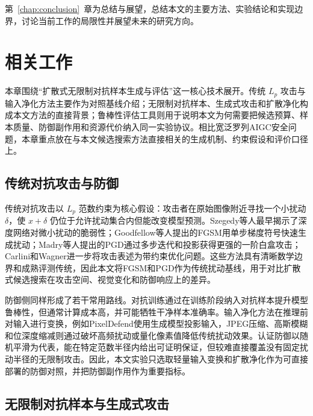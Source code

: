 \documentclass[type=bachelor,oneside]{fduthesis}
\begin{document}
第~\ref{chap:conclusion}~章为总结与展望，总结本文的主要方法、实验结论和实现边界，讨论当前工作的局限性并展望未来的研究方向。

\chapter{相关工作}
\label{chap:related}

本章围绕“扩散式无限制对抗样本生成与评估”这一核心技术展开。传统 $L_p$ 攻击与输入净化方法主要作为对照基线介绍；无限制对抗样本、生成式攻击和扩散净化构成本文方法的直接背景；鲁棒性评估工具则用于说明本文为何需要把候选预算、样本质量、防御副作用和资源代价纳入同一实验协议。相比宽泛罗列AIGC安全问题，本章重点放在与本文候选搜索方法直接相关的生成机制、约束假设和评价口径上。

\section{传统对抗攻击与防御}
\label{sec:traditional}

传统对抗攻击以 $L_p$ 范数约束为核心假设：攻击者在原始图像附近寻找一个小扰动 $\delta$，使 $x+\delta$ 仍位于允许扰动集合内但能改变模型预测。Szegedy等人\cite{szegedy2014intriguing}最早揭示了深度网络对微小扰动的脆弱性；Goodfellow等人\cite{goodfellow2015explaining}提出的FGSM用单步梯度符号快速生成扰动；Madry等人\cite{madry2018towards}提出的PGD通过多步迭代和投影获得更强的一阶白盒攻击；Carlini和Wagner\cite{carlini2017towards}进一步将攻击表述为带约束优化问题。这些方法具有清晰数学边界和成熟评测传统，因此本文将FGSM和PGD作为传统扰动基线，用于对比扩散式候选搜索在攻击空间、视觉变化和防御响应上的差异。

防御侧同样形成了若干常用路线。对抗训练\cite{madry2018towards,tramer2020ensemble}通过在训练阶段纳入对抗样本提升模型鲁棒性，但通常计算成本高，并可能牺牲干净样本准确率。输入净化方法在推理前对输入进行变换，例如PixelDefend\cite{song2018pixeldefend}使用生成模型投影输入，JPEG压缩、高斯模糊和位深度缩减则通过破坏高频扰动或量化像素值降低传统扰动效果。认证防御以随机平滑\cite{cohen2019certified}为代表，能在特定范数半径内给出可证明保证，但较难直接覆盖没有固定扰动半径的无限制攻击。因此，本文实验只选取轻量输入变换和扩散净化作为可直接部署的防御对照，并把防御副作用作为重要指标。

\section{无限制对抗样本与生成式攻击}
\label{sec:unrestricted}
\end{document}
